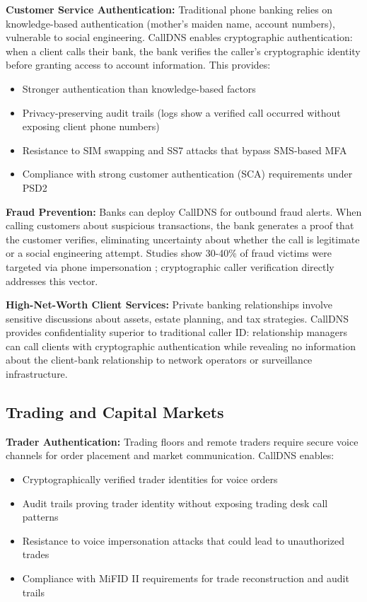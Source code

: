 \documentclass[11pt,twocolumn]{article}
\begin{document}
\textbf{Customer Service Authentication:} Traditional phone banking relies on knowledge-based authentication (mother's maiden name, account numbers), vulnerable to social engineering. CallDNS enables cryptographic authentication: when a client calls their bank, the bank verifies the caller's cryptographic identity before granting access to account information. This provides:
\begin{itemize}
\item Stronger authentication than knowledge-based factors
\item Privacy-preserving audit trails (logs show a verified call occurred without exposing client phone numbers)
\item Resistance to SIM swapping and SS7 attacks that bypass SMS-based MFA
\item Compliance with strong customer authentication (SCA) requirements under PSD2
\end{itemize}

\textbf{Fraud Prevention:} Banks can deploy CallDNS for outbound fraud alerts. When calling customers about suspicious transactions, the bank generates a proof that the customer verifies, eliminating uncertainty about whether the call is legitimate or a social engineering attempt. Studies show 30-40\% of fraud victims were targeted via phone impersonation \cite{fbigis2020}; cryptographic caller verification directly addresses this vector.

\textbf{High-Net-Worth Client Services:} Private banking relationships involve sensitive discussions about assets, estate planning, and tax strategies. CallDNS provides confidentiality superior to traditional caller ID: relationship managers can call clients with cryptographic authentication while revealing no information about the client-bank relationship to network operators or surveillance infrastructure.

\subsection{Trading and Capital Markets}

\textbf{Trader Authentication:} Trading floors and remote traders require secure voice channels for order placement and market communication. CallDNS enables:
\begin{itemize}
\item Cryptographically verified trader identities for voice orders
\item Audit trails proving trader identity without exposing trading desk call patterns
\item Resistance to voice impersonation attacks that could lead to unauthorized trades
\item Compliance with MiFID II requirements for trade reconstruction and audit trails
\end{itemize}
\end{document}

